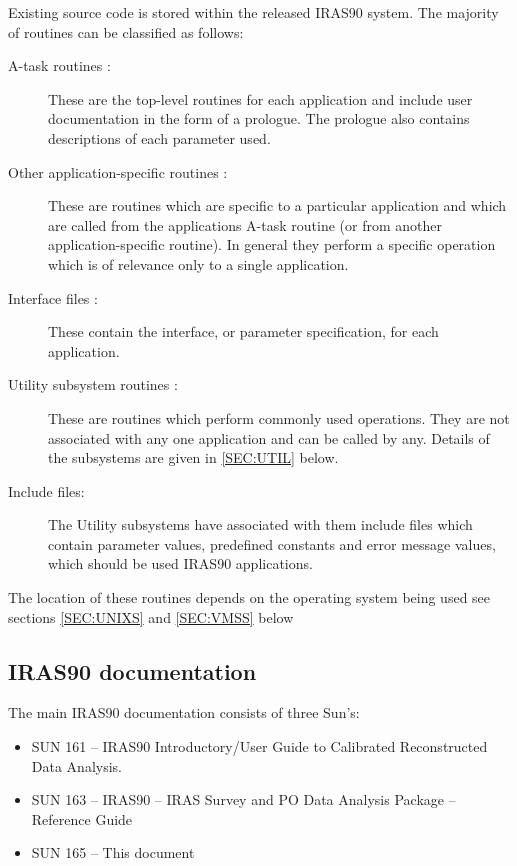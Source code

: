 Existing source code is stored within the released {\small IRAS90} system. 
The majority of routines can be classified as follows:

\begin{description}

\item [A-task routines :] These are the top-level routines for each
application and include user documentation in the form of a prologue.
The prologue also contains descriptions of each parameter used. 

\item [Other application-specific routines :] These are routines which
are specific to a particular application and which are called from the
applications A-task routine (or from another application-specific
routine). In general they perform a specific operation which is of
relevance only to a single application.

\item [Interface files :] These contain the interface, or parameter
specification, for each application.

\item [Utility subsystem routines :] These are routines which perform commonly
used operations. They are not associated with any one application and
can be called by any. Details of the subsystems are given in \ref{SEC:UTIL} 
below.

\item [Include files:] The Utility subsystems have associated with them include
files which contain parameter values, predefined constants and error message
values, which should be used {\small IRAS90} applications.

\end{description}

The location of these routines depends on the operating system being
used see sections \ref{SEC:UNIXS} and \ref{SEC:VMSS} below

\subsection{IRAS90 documentation}

The main {\small IRAS90} documentation consists of three Sun's: 

\begin{itemize}

\item SUN 161 -- IRAS90 Introductory/User Guide to Calibrated Reconstructed 
Data Analysis.
 
\item SUN 163 -- IRAS90 -- IRAS Survey and PO Data Analysis Package --
Reference Guide

\item SUN 165 -- This document

\end{itemize}

